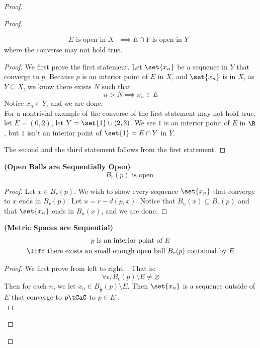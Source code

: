 \documentclass{report}
\begin{document}
\begin{proof}
\begin{proof}
\begin{theorem}
\begin{gather*}
E\text{ is open in $X$ }\implies E\cap Y\text{ is open in $Y$ }
\end{gather*}
where the converse may not hold true.
\end{theorem}
\begin{proof}
We first prove the first statement. Let $\set{x_n}$ be a sequence in $Y$ that converge to $p$. Because  $p$ is an interior point of  $E$ in  $X$, and  $\set{x_n}$ is in $X$, as  $Y\subseteq X$, we know there exists $N$ such that 
 \begin{equation*}
n>N\implies x_n\in E
\end{equation*}
Notice $x_n\in Y$, and we are done.\\

For a nontrivial example of the converse of the first statement may not hold true, let $E=(0,2)$, let $Y=\set{1}\cup (2,3)$. We see $1$ is an interior point of  $E$ in  $\R$, but  $1$ isn't an interior point of  $\set{1}=E\cap Y$ in $Y$.

The second and the third statement follows from the first statement. 
\end{proof}
\begin{theorem}
\label{3.3.9}
  \textbf{(Open Balls are Sequentially Open)} 
  \begin{equation*}
  B_r(p)\text{ is open }
  \end{equation*}
\end{theorem}
\begin{proof}
Let $x\in B_r(p)$. We wish to show every sequence $\set{x_n}$ that converge to $x$ ends in  $B_r(p)$. Let $u=r-d(p,x)$. Notice that $B_u(x)\subseteq B_r(p)$ and that $\set{x_n}$ ends in $B_u(x)$, and we are done.
\end{proof}
\begin{theorem}
\label{3.3.10}
\textbf{(Metric Spaces are Sequential)} 
\begin{gather*}
\text{ $p$ is an interior point of $E$ }\\
\liff \text{ there exists an small enough open ball $B_r(p)$ contained by $E$}
\end{gather*}
\end{theorem}
\begin{proof}
We first prove from left to right. . That is:
\begin{equation*}
\forall \epsilon, B_\epsilon (p)\setminus E\neq \varnothing
\end{equation*}
Then for each $n$, we let  $x_n\in B_{\frac{1}{n}}(p)\setminus E$. Then $\set{x_n}$ is a sequence outside of $E$ that converge to  $p\tCaC$ to $p\in E^\circ $.\\


\end{proof}
\end{proof}
\end{proof}
\end{document}
